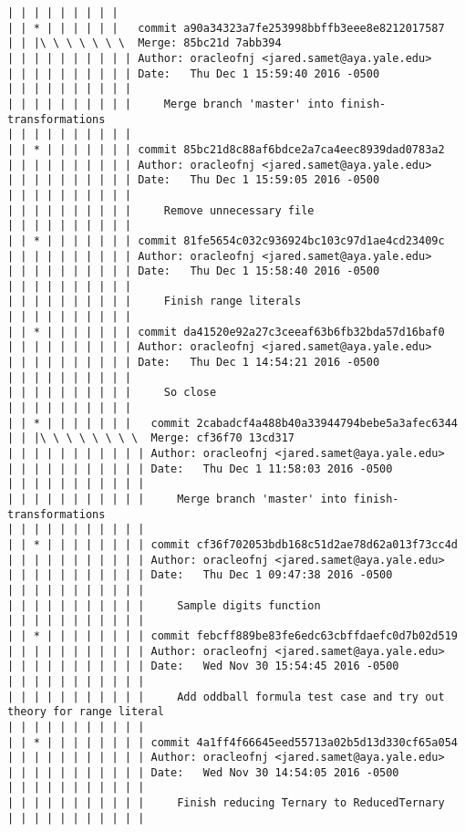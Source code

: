 \begin{lstlisting}
| | | | | | | | |            
| | * | | | | | |   commit a90a34323a7fe253998bbffb3eee8e8212017587
| | |\ \ \ \ \ \ \  Merge: 85bc21d 7abb394
| | | | | | | | | | Author: oracleofnj <jared.samet@aya.yale.edu>
| | | | | | | | | | Date:   Thu Dec 1 15:59:40 2016 -0500
| | | | | | | | | | 
| | | | | | | | | |     Merge branch 'master' into finish-transformations
| | | | | | | | | |           
| | * | | | | | | | commit 85bc21d8c88af6bdce2a7ca4eec8939dad0783a2
| | | | | | | | | | Author: oracleofnj <jared.samet@aya.yale.edu>
| | | | | | | | | | Date:   Thu Dec 1 15:59:05 2016 -0500
| | | | | | | | | | 
| | | | | | | | | |     Remove unnecessary file
| | | | | | | | | |           
| | * | | | | | | | commit 81fe5654c032c936924bc103c97d1ae4cd23409c
| | | | | | | | | | Author: oracleofnj <jared.samet@aya.yale.edu>
| | | | | | | | | | Date:   Thu Dec 1 15:58:40 2016 -0500
| | | | | | | | | | 
| | | | | | | | | |     Finish range literals
| | | | | | | | | |           
| | * | | | | | | | commit da41520e92a27c3ceeaf63b6fb32bda57d16baf0
| | | | | | | | | | Author: oracleofnj <jared.samet@aya.yale.edu>
| | | | | | | | | | Date:   Thu Dec 1 14:54:21 2016 -0500
| | | | | | | | | | 
| | | | | | | | | |     So close
| | | | | | | | | |             
| | * | | | | | | |   commit 2cabadcf4a488b40a33944794bebe5a3afec6344
| | |\ \ \ \ \ \ \ \  Merge: cf36f70 13cd317
| | | | | | | | | | | Author: oracleofnj <jared.samet@aya.yale.edu>
| | | | | | | | | | | Date:   Thu Dec 1 11:58:03 2016 -0500
| | | | | | | | | | | 
| | | | | | | | | | |     Merge branch 'master' into finish-transformations
| | | | | | | | | | |            
| | * | | | | | | | | commit cf36f702053bdb168c51d2ae78d62a013f73cc4d
| | | | | | | | | | | Author: oracleofnj <jared.samet@aya.yale.edu>
| | | | | | | | | | | Date:   Thu Dec 1 09:47:38 2016 -0500
| | | | | | | | | | | 
| | | | | | | | | | |     Sample digits function
| | | | | | | | | | |            
| | * | | | | | | | | commit febcff889be83fe6edc63cbffdaefc0d7b02d519
| | | | | | | | | | | Author: oracleofnj <jared.samet@aya.yale.edu>
| | | | | | | | | | | Date:   Wed Nov 30 15:54:45 2016 -0500
| | | | | | | | | | | 
| | | | | | | | | | |     Add oddball formula test case and try out theory for range literal
| | | | | | | | | | |            
| | * | | | | | | | | commit 4a1ff4f66645eed55713a02b5d13d330cf65a054
| | | | | | | | | | | Author: oracleofnj <jared.samet@aya.yale.edu>
| | | | | | | | | | | Date:   Wed Nov 30 14:54:05 2016 -0500
| | | | | | | | | | | 
| | | | | | | | | | |     Finish reducing Ternary to ReducedTernary
| | | | | | | | | | |            

\end{lstlisting}
